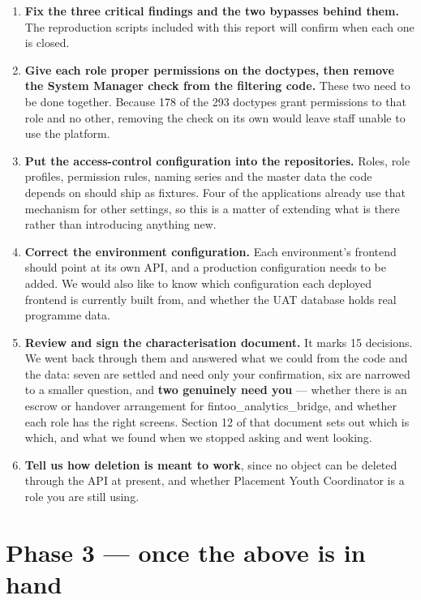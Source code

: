 \documentclass[10pt,a4paper]{article}
\newcommand{\code}[1]{{\ttfamily #1}}
\begin{document}
\begin{enumerate}[leftmargin=1.5em]
  \item \textbf{Fix the three critical findings and the two bypasses behind them.} The
        reproduction scripts included with this report will confirm when each one is closed.
  \item \textbf{Give each role proper permissions on the doctypes, then remove the
        \code{System Manager} check from the filtering code.} These two need to be done together.
        Because 178 of the 293 doctypes grant permissions to that role and no other, removing the
        check on its own would leave staff unable to use the platform.
  \item \textbf{Put the access-control configuration into the repositories.} Roles, role profiles,
        permission rules, naming series and the master data the code depends on should ship as
        fixtures. Four of the applications already use that mechanism for other settings, so this
        is a matter of extending what is there rather than introducing anything new.
  \item \textbf{Correct the environment configuration.} Each environment's frontend should point at
        its own API, and a production configuration needs to be added. We would also like to know
        which configuration each deployed frontend is currently built from, and whether the UAT
        database holds real programme data.
  \item \textbf{Review and sign the characterisation document.} It marks 15 decisions. We went back through them and answered what we could from the code and the data: seven are settled and need only your confirmation, six are narrowed to a smaller question, and \textbf{two genuinely need you} — whether there is an escrow or handover arrangement for \code{fintoo\_analytics\_bridge}, and whether each role has the right screens. Section 12 of that document sets out which is which, and what we found when we stopped asking and went looking.

  \item \textbf{Tell us how deletion is meant to work}, since no object can be deleted through the
        API at present, and whether \code{Placement Youth Coordinator} is a role you are still
        using.
\end{enumerate}

\section{Phase 3 — once the above is in hand}
\end{document}
